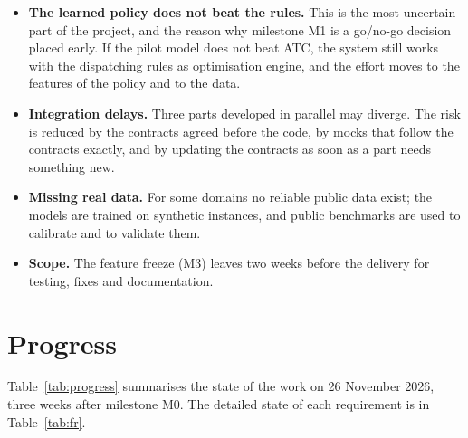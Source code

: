 \begin{itemize}
  \item \textbf{The learned policy does not beat the rules.} This is the most uncertain part of
        the project, and the reason why milestone M1 is a go/no-go decision placed early. If the
        pilot model does not beat ATC, the system still works with the dispatching rules as
        optimisation engine, and the effort moves to the features of the policy and to the data.
  \item \textbf{Integration delays.} Three parts developed in parallel may diverge. The risk is
        reduced by the contracts agreed before the code, by mocks that follow the contracts
        exactly, and by updating the contracts as soon as a part needs something new.
  \item \textbf{Missing real data.} For some domains no reliable public data exist; the models
        are trained on synthetic instances, and public benchmarks are used to calibrate and to
        validate them.
  \item \textbf{Scope.} The feature freeze (M3) leaves two weeks before the delivery for testing,
        fixes and documentation.
\end{itemize}

\section{Progress}
\label{sec:progress}

Table~\ref{tab:progress} summarises the state of the work on 26 November 2026, three weeks after
milestone M0. The detailed state of each requirement is in Table~\ref{tab:fr}.

